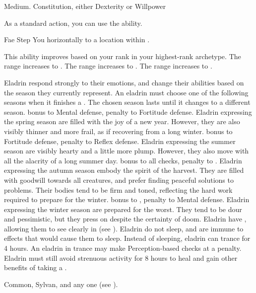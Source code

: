      Medium.
      Constitution, either  Dexterity or  Willpower
    \begin{raggeditemize}
         As a standard action, you can use the  ability.
        \begin{magicalactiveability}{Fae Step}
            \rankline
            You  horizontally to a location within \shortrange.

            \rankline
            This ability improves based on your rank in your highest-rank archetype.
             The range increases to \medrange.
             The range increases to \longrange.
             The range increases to \distrange.
        \end{magicalactiveability}
         Eladrin respond strongly to their emotions, and change their abilities based on the season they currently represent.
            An eladrin must choose one of the following seasons when it finishes a .
            The chosen season lasts until it changes to a different season.
              bonus to Mental defense,  penalty to Fortitude defense.
            Eladrin expressing the spring season are filled with the joy of a new year.
            However, they are also visibly thinner and more frail, as if recovering from a long winter.
              bonus to Fortitude defense,  penalty to Reflex defense.
            Eladrin expressing the summer season are visibly hearty and a little more plump.
            However, they also move with all the alacrity of a long summer day.
              bonus to all checks,  penalty to .
            Eladrin expressing the autumn season embody the spirit of the harvest.
            They are filled with goodwill towards all creatures, and prefer finding peaceful solutions to problems.
            Their bodies tend to be firm and toned, reflecting the hard work required to prepare for the winter.
              bonus to ,  penalty to Mental defense.
            Eladrin expressing the winter season are prepared for the worst.
            They tend to be dour and pessimistic, but they press on despite the certainty of doom.
         Eladrin have , allowing them to see clearly in  (see ).
         Eladrin do not sleep, and are immune to \magical effects that would cause them to sleep.
            Instead of sleeping, eladrin can trance for 4 hours.
            An eladrin in trance may make Perception-based checks at a  penalty.
            Eladrin must still avoid strenuous activity for 8 hours to heal and gain other benefits of taking a .
    \end{raggeditemize}
     Common, Sylvan, and any one  (see ).

